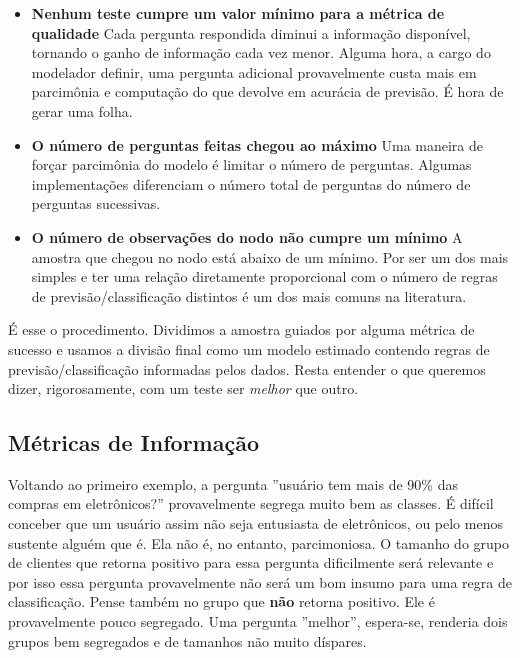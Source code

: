 \begin{itemize}
    \item \textbf{Nenhum teste cumpre um valor mínimo para a métrica de qualidade} \newline Cada pergunta respondida diminui a informação disponível, tornando o ganho de informação cada vez menor. Alguma hora, a cargo do modelador definir, uma pergunta adicional provavelmente custa mais em parcimônia e computação do que devolve em acurácia de previsão. É hora de gerar uma folha.
    
    \item \textbf{O número de perguntas feitas chegou ao máximo} \newline
    Uma maneira de forçar parcimônia do modelo é limitar o número de perguntas. Algumas implementações diferenciam o número total de perguntas do número de perguntas sucessivas.  
    
    \item \textbf{O número de observações do nodo não cumpre um mínimo} \newline 
    A amostra que chegou no nodo está abaixo de um mínimo. Por ser um dos mais simples e ter uma relação diretamente proporcional com o número de regras de previsão/classificação distintos é um dos mais comuns na literatura.
\end{itemize}

É esse o procedimento. Dividimos a amostra guiados por alguma métrica de sucesso e usamos a divisão final como um modelo estimado contendo regras de previsão/classificação informadas pelos dados. Resta entender o que queremos dizer, rigorosamente, com um teste ser \textit{melhor} que outro.


\subsection{Métricas de Informação}

Voltando ao primeiro exemplo, a pergunta ''usuário tem mais de 90\% das compras em eletrônicos?'' provavelmente segrega muito bem as classes. É difícil conceber que um usuário assim não seja entusiasta de eletrônicos, ou pelo menos sustente alguém que é. Ela não é, no entanto, parcimoniosa. O tamanho do grupo de clientes que retorna positivo para essa pergunta dificilmente será relevante e por isso essa pergunta provavelmente não será um bom insumo para uma regra de classificação. Pense também no grupo que \textbf{não} retorna positivo. Ele é provavelmente pouco segregado. Uma pergunta ''melhor'', espera-se, renderia dois grupos bem segregados e de tamanhos não muito díspares. 

